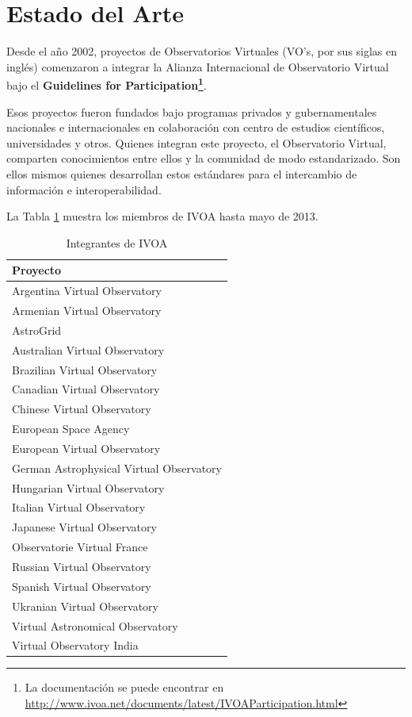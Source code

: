 \section{Estado del Arte}

Desde el año 2002, proyectos de Observatorios Virtuales (VO's, por sus siglas en inglés) comenzaron a integrar
la Alianza Internacional de Observatorio Virtual bajo el \textbf{Guidelines
for Participation\footnote{La documentación se puede
encontrar en \url{http://www.ivoa.net/documents/latest/IVOAParticipation.html}}}.

Esos proyectos fueron fundados bajo programas privados y gubernamentales nacionales e
internacionales en colaboración con centro de estudios científicos,
universidades y otros. Quienes integran este proyecto, el Observatorio Virtual, 
comparten conocimientos entre ellos y la comunidad de modo estandarizado. Son 
ellos mismos quienes desarrollan estos estándares para el intercambio de 
información e interoperabilidad.

La Tabla \ref{table:integrantes} muestra los miembros de IVOA hasta mayo de
2013.

\begin{table}[h!t]
	\centering
	\caption{Integrantes de IVOA}	
	\begin{tabular}{l} \hline
		\textbf{Proyecto} \\\hline
			Argentina Virtual Observatory \cite{arg} \\
			Armenian Virtual Observatory \cite{arm}\\
			AstroGrid \cite{astrogrid}\\
			Australian Virtual Observatory \cite{aus}\\
			Brazilian Virtual Observatory \cite{bra}\\
			Canadian Virtual Observatory \cite{can}\\
			Chinese Virtual Observatory \cite{china}\\
			European Space Agency \cite{esa}\\
			European Virtual Observatory \cite{euro}\\
			German Astrophysical Virtual Observatory \cite{ger}\\
			Hungarian Virtual Observatory \cite{hun}\\
			Italian Virtual Observatory \cite{ita}\\
			Japanese Virtual Observatory \cite{jap}\\
			Observatorie Virtual France \cite{fra}\\
			Russian Virtual Observatory \cite{rus}\\
			Spanish Virtual Observatory \cite{spa}\\
			Ukranian Virtual Observatory \cite{ukr}\\
			Virtual Astronomical Observatory \cite{usa}\\
			Virtual Observatory India \cite{ind}\\
            \hline
	\end{tabular}
	\label{table:integrantes}
\end{table}

